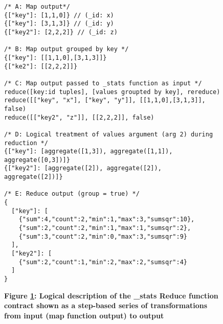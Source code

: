 \begin{figure}[H]
  \centering
  \begin{mdframed}[rightline=true,leftline=true]
    \begin{verbatim}
/* A: Map output*/
{["key"]: [1,1,0]} // (_id: x)
{["key"]: [3,1,3]} // (_id: y)
{["key2"]: [2,2,2]} // (_id: z)

/* B: Map output grouped by key */
{["key"]: [[1,1,0],[3,1,3]]}
{["ke2"]: [[2,2,2]]}

/* C: Map output passed to _stats function as input */
reduce([key:id tuples], [values groupted by key], rereduce)
reduce([["key", "x"], ["key", "y"]], [[1,1,0],[3,1,3]], false)
reduce([["key2", "z"]], [[2,2,2]], false)

/* D: Logical treatment of values argument (arg 2) during reduction */
{["key"]: [aggregate([1,3]), aggregate([1,1]),  aggregate([0,3])]}
{["key2"]: [aggregate([2]), aggregate([2]),  aggregate([2])]}

/* E: Reduce output (group = true) */
{
  ["key"]: [
    {"sum":4,"count":2,"min":1,"max":3,"sumsqr":10},
    {"sum":2,"count":2,"min":1,"max":1,"sumsqr":2},
    {"sum":3,"count":2,"min":0,"max":3,"sumsqr":9}
  ],
  ["key2"]: [
    {"sum":2,"count":1,"min":2,"max":2,"sumsqr":4}
  ]
}
    \end{verbatim}
  \end{mdframed}
  \caption[\_stats Reduce Function Logic]{\textbf{Figure \ref{fig-stats-reduce-fn}: Logical description of the \_stats Reduce function contract shown as a step-based series of transformations from input (map function output) to output}}
  \label{fig-stats-reduce-fn}
\end{figure}